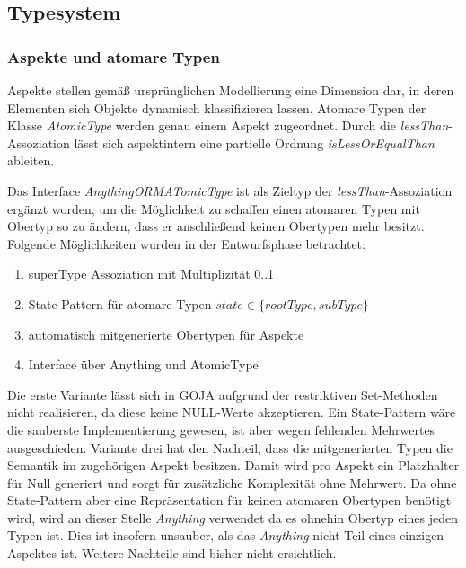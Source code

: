 \subsection{Typesystem}

\subsubsection{Aspekte und atomare Typen}

Aspekte stellen gemäß ursprünglichen Modellierung eine Dimension dar, in deren Elementen sich Objekte dynamisch klassifizieren lassen. 
Atomare Typen der Klasse \emph{AtomicType} werden genau einem Aspekt zugeordnet. Durch die \emph{lessThan}-Assoziation lässt sich aspektintern eine 
partielle Ordnung \emph{isLessOrEqualThan} ableiten.  


Das Interface \emph{AnythingORMATomicType} ist als Zieltyp der \emph{lessThan}-Assoziation ergänzt worden, 
um die Möglichkeit zu schaffen einen atomaren Typen mit Obertyp so zu ändern, dass er anschließend keinen 
Obertypen mehr besitzt. Folgende Möglichkeiten wurden in der Entwurfsphase betrachtet: 
\begin{enumerate}
  		\item superType Assoziation mit Multiplizität 0..1
		\item State-Pattern für atomare Typen \(state \in \{rootType, subType\}\)
        \item automatisch mitgenerierte Obertypen für Aspekte
        \item Interface über Anything und AtomicType
\end{enumerate}

Die erste Variante lässt sich in GOJA aufgrund der restriktiven Set-Methoden nicht realisieren, da diese keine NULL-Werte akzeptieren.
Ein State-Pattern wäre die sauberste Implementierung gewesen, ist aber wegen fehlenden Mehrwertes ausgeschieden. 
Variante drei hat den Nachteil, dass die mitgenerierten Typen die Semantik  im zugehörigen Aspekt besitzen.
Damit wird pro Aspekt ein Platzhalter für Null generiert und sorgt für zusätzliche Komplexität ohne Mehrwert. 
Da ohne State-Pattern aber eine Repräsentation für keinen atomaren Obertypen benötigt wird, wird an dieser Stelle \emph{Anything} verwendet 
da es ohnehin Obertyp eines jeden Typen ist. Dies ist insofern unsauber, als das \emph{Anything} nicht Teil eines einzigen Aspektes ist.
Weitere Nachteile sind bisher nicht ersichtlich.


